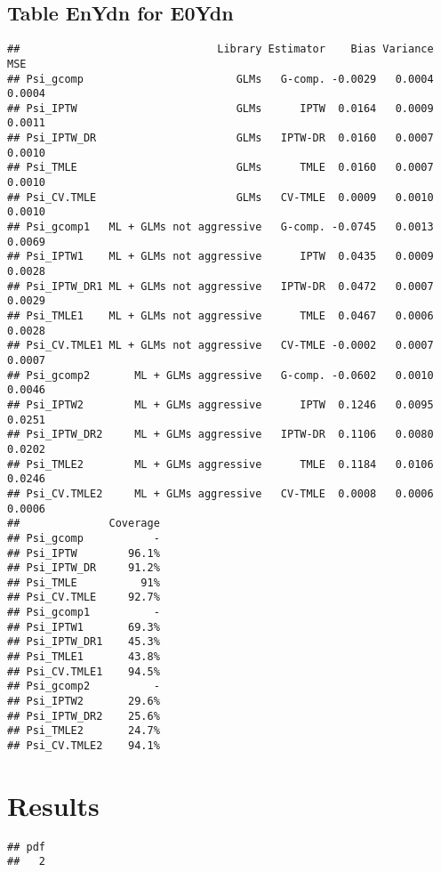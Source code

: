 \documentclass[11pt]{article}\usepackage[]{graphicx}\usepackage[]{color}
\makeatletter
\newenvironment{kframe}{%
 \def\at@end@of@kframe{}%
 \ifinner\ifhmode%
  \def\at@end@of@kframe{\end{minipage}}%
  \begin{minipage}{\columnwidth}%
 \fi\fi%
 \def\FrameCommand##1{\hskip\@totalleftmargin \hskip-\fboxsep
 \colorbox{shadecolor}{##1}\hskip-\fboxsep
     \hskip-\linewidth \hskip-\@totalleftmargin \hskip\columnwidth}%
 \MakeFramed {\advance\hsize-\width
   \@totalleftmargin\z@ \linewidth\hsize
   \@setminipage}}%
 {\par\unskip\endMakeFramed%
 \at@end@of@kframe}
\newenvironment{knitrout}{}{} %
\makeatother
\begin{document}
\subsection{Table EnYdn for E0Ydn}
\begin{knitrout}
\color{fgcolor}\begin{kframe}
\begin{verbatim}
##                               Library Estimator    Bias Variance    MSE
## Psi_gcomp                        GLMs   G-comp. -0.0029   0.0004 0.0004
## Psi_IPTW                         GLMs      IPTW  0.0164   0.0009 0.0011
## Psi_IPTW_DR                      GLMs   IPTW-DR  0.0160   0.0007 0.0010
## Psi_TMLE                         GLMs      TMLE  0.0160   0.0007 0.0010
## Psi_CV.TMLE                      GLMs   CV-TMLE  0.0009   0.0010 0.0010
## Psi_gcomp1   ML + GLMs not aggressive   G-comp. -0.0745   0.0013 0.0069
## Psi_IPTW1    ML + GLMs not aggressive      IPTW  0.0435   0.0009 0.0028
## Psi_IPTW_DR1 ML + GLMs not aggressive   IPTW-DR  0.0472   0.0007 0.0029
## Psi_TMLE1    ML + GLMs not aggressive      TMLE  0.0467   0.0006 0.0028
## Psi_CV.TMLE1 ML + GLMs not aggressive   CV-TMLE -0.0002   0.0007 0.0007
## Psi_gcomp2       ML + GLMs aggressive   G-comp. -0.0602   0.0010 0.0046
## Psi_IPTW2        ML + GLMs aggressive      IPTW  0.1246   0.0095 0.0251
## Psi_IPTW_DR2     ML + GLMs aggressive   IPTW-DR  0.1106   0.0080 0.0202
## Psi_TMLE2        ML + GLMs aggressive      TMLE  0.1184   0.0106 0.0246
## Psi_CV.TMLE2     ML + GLMs aggressive   CV-TMLE  0.0008   0.0006 0.0006
##              Coverage
## Psi_gcomp           -
## Psi_IPTW        96.1%
## Psi_IPTW_DR     91.2%
## Psi_TMLE          91%
## Psi_CV.TMLE     92.7%
## Psi_gcomp1          -
## Psi_IPTW1       69.3%
## Psi_IPTW_DR1    45.3%
## Psi_TMLE1       43.8%
## Psi_CV.TMLE1    94.5%
## Psi_gcomp2          -
## Psi_IPTW2       29.6%
## Psi_IPTW_DR2    25.6%
## Psi_TMLE2       24.7%
## Psi_CV.TMLE2    94.1%
\end{verbatim}
\end{kframe}
\end{knitrout}




\section{Results}
\begin{knitrout}
\color{fgcolor}\begin{kframe}
\begin{verbatim}
## pdf 
##   2
\end{verbatim}
\end{kframe}
\end{knitrout}
\end{document}
